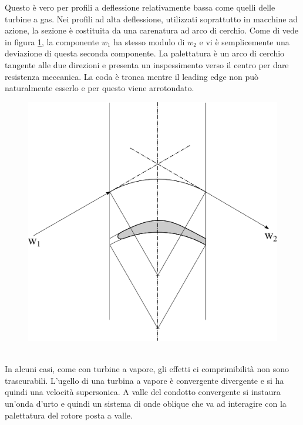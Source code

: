 Questo è vero per profili a deflessione relativamente bassa come quelli delle turbine a gas. Nei profili ad alta deflessione, utilizzati soprattutto in macchine ad azione, la sezione è costituita da una carenatura ad arco di cerchio. Come di vede in figura \ref{fig:palaBassaDef}, la componente $w_1$ ha stesso modulo di $w_2$ e vi è semplicemente una deviazione di questa seconda componente. La palettatura è un arco di cerchio tangente alle due direzioni e presenta un inspessimento verso il centro per dare resistenza meccanica. La coda è tronca mentre il leading edge non può naturalmente esserlo e per questo viene arrotondato. 
\begin{figure}
\centering
  \includegraphics[width=.6\textwidth]{fig/palaBassaDef.pdf}
\caption{}
\label{fig:palaBassaDef}
\end{figure}
\\In alcuni casi, come con turbine a vapore, gli effetti ci comprimibilità non sono trascurabili. L'ugello di una turbina a vapore è convergente divergente e si ha quindi una velocità supersonica. A valle del condotto convergente si instaura un'onda d'urto e quindi un sistema di onde oblique che va ad interagire con la palettatura del rotore posta a valle.
